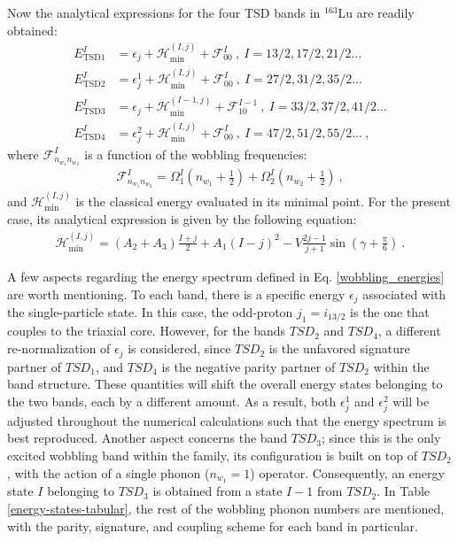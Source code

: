 \documentclass[myclassdoc,debug]{rjparticle}
\begin{document}
Now  the analytical expressions for the four TSD bands in $^{163}$Lu are readily obtained:
\begin{align}
    E_\text{TSD1}^I&=\epsilon_j+\mathcal{H}_\text{min}^{(I,j)}+\mathcal{F}_{00}^I\ ,\ I=13/2,17/2,21/2\dots \nonumber \\
    E_\text{TSD2}^I&=\epsilon_j^1+\mathcal{H}_\text{min}^{(I,j)}+\mathcal{F}_{00}^I\ ,\ I=27/2,31/2,35/2\dots \nonumber \\
    E_\text{TSD3}^I&=\epsilon_j+\mathcal{H}_\text{min}^{(I-1,j)}+\mathcal{F}_{10}^{I-1}\ ,\ I=33/2,37/2,41/2\dots \nonumber \\
    E_\text{TSD4}^I&=\epsilon_j^2+\mathcal{H}_\text{min}^{(I,j)}+\mathcal{F}_{00}^I\ ,\ I=47/2,51/2,55/2\dots\ ,
    \label{wobbling_energies}
\end{align}
where $\mathcal{F}_{n_{w_1}n_{w_2}}^I$ is a function of the wobbling frequencies:
\begin{align}
    \mathcal{F}_{n_{w_1}n_{w_2}}^I=\Omega_1^I\left(n_{w_1}+\frac{1}{2}\right)+\Omega_2^I\left(n_{w_2}+\frac{1}{2}\right)\ ,
    \label{f-term}
\end{align}
and $\mathcal{H}_\text{min}^{(I,j)}$ is the classical energy evaluated in its minimal point. For the present case, its analytical expression is given by the following equation:
\begin{align}
\mathcal{H}_\text{min}^{(I,j)}=(A_2+A_3)\frac{I+j}{2}+A_1(I-j)^2-V\frac{2j-1}{j+1}\sin\left(\gamma+\frac{\pi}{6}\right)\ .
    \label{hmin:equation}
\end{align}

A few aspects regarding the energy spectrum defined in Eq. \ref{wobbling_energies} are worth mentioning. To each band, there is a specific energy $\epsilon_j$ associated with the single-particle state. In this case, the odd-proton $j_1=i_{13/2}$ is the one that couples to the triaxial core. However, for the bands $TSD_2$ and $TSD_4$, a different re-normalization of $\epsilon_j$ is considered, since $TSD_2$ is the unfavored signature partner of $TSD_1$, and $TSD_4$ is the negative parity partner of $TSD_2$ within the band structure. These quantities will shift the overall energy states belonging to the two bands, each by a different amount. As a result, both $\epsilon_j^1$ and $\epsilon_j^2$ will be adjusted throughout the numerical calculations such that the energy spectrum is best reproduced. Another aspect concerns the band $TSD_3$; since this is the only excited wobbling band within the family, its configuration is built on top of $TSD_2$, with the action of a single phonon ($n_{w_1}=1$) operator. Consequently, an energy state $I$ belonging to $TSD_3$ is obtained from a state $I-1$ from $TSD_2$. In Table \ref{energy-states-tabular}, the rest of the wobbling phonon numbers are mentioned, with the parity, signature, and coupling scheme for each band in particular.
\end{document}
